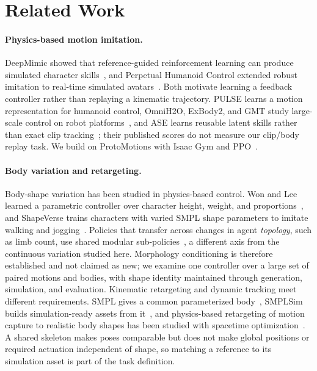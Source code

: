 \section{Related Work}\label{sec:related_work}

\paragraph{Physics-based motion imitation.}
DeepMimic showed that reference-guided reinforcement learning can produce
simulated character skills~\cite{deepmimic}, and Perpetual Humanoid Control
extended robust imitation to real-time simulated avatars~\cite{phc}. Both
motivate learning a feedback controller rather than replaying a kinematic
trajectory. PULSE learns a motion representation for humanoid control, OmniH2O,
ExBody2, and GMT study large-scale control on robot
platforms~\cite{pulse,omnih2o,exbody2,gmt}, and ASE learns reusable latent
skills rather than exact clip tracking~\cite{ase}; their published scores do not
measure our clip/body replay task. We build on ProtoMotions with Isaac Gym and
PPO~\cite{protomotions,isaacgym,ppo}.

\paragraph{Body variation and retargeting.}
Body-shape variation has been studied in physics-based control. Won and Lee
learned a parametric controller over character height, weight, and
proportions~\cite{won2019}, and ShapeVerse trains characters with varied SMPL
shape parameters to imitate walking and jogging~\cite{shapeverse}. Policies that
transfer across changes in agent \emph{topology}, such as limb count, use shared
modular sub-policies~\cite{smp2020}, a different axis from the continuous
variation studied here. Morphology conditioning is therefore established and
not claimed as new; we examine one controller over a large set of paired motions
and bodies, with shape identity maintained through generation, simulation, and
evaluation. Kinematic retargeting and dynamic tracking meet different
requirements. SMPL gives a common parameterized body~\cite{smpl}, SMPLSim builds
simulation-ready assets from it~\cite{smplsim}, and physics-based retargeting of
motion capture to realistic body shapes has been studied with spacetime
optimization~\cite{alborno2018}. A shared skeleton makes poses comparable but
does not make global positions or required actuation independent of shape, so
matching a reference to its simulation asset is part of the task definition.

